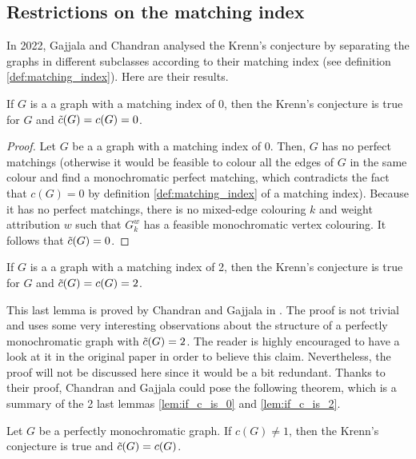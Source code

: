 \subsection{Restrictions on the matching index}

In 2022, Gajjala and Chandran analysed the Krenn's conjecture by separating the graphs in different subclasses according to their matching index (see definition \ref{def:matching_index}). Here are their results.

\begin{lemma}
    \label{lem:if_c_is_0}
    If $G$ is a a graph with a matching index of 0, then the Krenn's conjecture is true for $G$ and $\Tilde{c}(G) = c(G) = 0$.
\end{lemma}

\begin{proof}
    Let $G$ be a a graph with a matching index of 0. Then, $G$ has no perfect matchings (otherwise it would be feasible to colour all the edges of $G$ in the same colour and find a monochromatic perfect matching, which contradicts the fact that $c(G) = 0$ by definition \ref{def:matching_index} of a matching index). Because it has no perfect matchings, there is no mixed-edge colouring $k$ and weight attribution $w$ such that $G_k^w$ has a feasible monochromatic vertex colouring. It follows that $\Tilde{c}(G) = 0$.
\end{proof}

\begin{lemma}
    \label{lem:if_c_is_2}
    If $G$ is a a graph with a matching index of 2, then the Krenn's conjecture is true for $G$ and $\Tilde{c}(G) = c(G) = 2$.
\end{lemma}

This last lemma is proved by Chandran and Gajjala in \cite{chandran}. The proof is not trivial and uses some very interesting observations about the structure of a perfectly monochromatic graph with $\Tilde{c}(G) = 2$. The reader is highly encouraged to have a look at it in the original paper in order to believe this claim. Nevertheless, the proof will not be discussed here since it would be a bit redundant. Thanks to their proof, Chandran and Gajjala could pose the following theorem, which is a summary of the 2 last lemmas \ref{lem:if_c_is_0} and \ref{lem:if_c_is_2}.

\begin{theorem}
    \label{thm:c_not_1}
    Let $G$ be a perfectly monochromatic graph. If $c(G) \neq 1$, then the Krenn's conjecture is true and $\Tilde{c}(G) = c(G)$.
\end{theorem}

